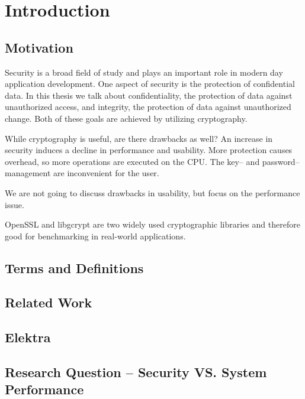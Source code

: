\chapter{Introduction}

\section{Motivation}

Security is a broad field of study and plays an important role in modern day application development.
One aspect of security is the protection of confidential data.
In this thesis we talk about confidentiality, the protection of data against unauthorized access, and integrity, the protection of data against unauthorized change.
Both of these goals are achieved by utilizing cryptography.

While cryptography is useful, are there drawbacks as well?
An increase in security induces a decline in performance and usability.
More protection causes overhead, so more operations are executed on the CPU.
The key-- and password--management are inconvenient for the user.

We are not going to discuss drawbacks in usability, but focus on the performance issue.


OpenSSL and libgcrypt are two widely used cryptographic libraries and therefore good for benchmarking in real-world applications.



\section{Terms and Definitions}

\section{Related Work}

\section{Elektra}

\section{Research Question -- Security VS. System Performance}